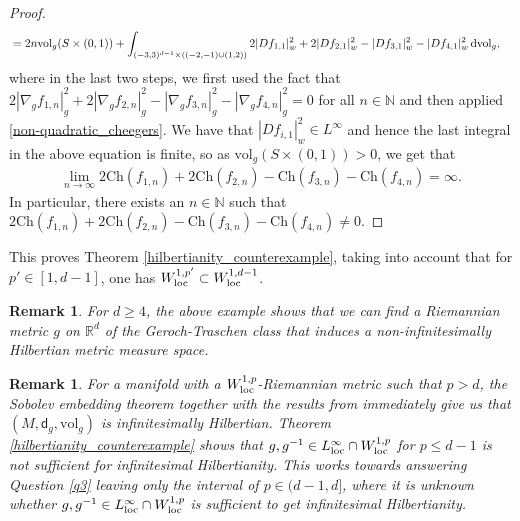 \documentclass[a4paper,10pt]{article}
\newtheorem{remark}[theorem]{Remark}
\numberwithin{equation}{section}
\newcommand{\R}{\mathbb{R}}
\newcommand{\N}{\mathbb{N}}
\newcommand{\vol}{\mathrm{vol}}
\newcommand{\Ch}{\mathrm{Ch}}
\newcommand{\sfd}{\mathsf d}
\newcommand{\di}{{\rm d}}
\begin{document}
\begin{proof}
\begin{align*}
    &= 2n \vol_g(S \times (0,1)) + \int_{(-3, 3)^{d-1}\times((-2, -1)\cup (1, 2))} 2|Df_{1,1}|^2_w +2|Df_{2,1}|^2_w-|Df_{3,1}|^2_w-|Df_{4,1}|^2_w\, \di \vol_g, 
    \end{align*}
where in the last two steps, we first used the fact that $2|\nabla_g f_{1, n}|_g^2 + 2|\nabla_g f_{2, n}|_g^2 -|\nabla_g f_{3, n}|_g^2-|\nabla_g f_{4, n}|_g^2=0$ for all $n \in \N$ and then applied \eqref{non-quadratic_cheegers}.
We have that $|Df_{i,1}|^2_w \in L^\infty$ and hence the last integral in the above equation is finite, so as $\vol_g(S \times (0,1 ))>0$, we get that 
\begin{align}
    \lim_{n \to \infty} 2\Ch(f_{1, n})+ 2\Ch(f_{2, n}) -\Ch(f_{3, n}) -\Ch(f_{4, n}) = \infty. 
\end{align}
In particular, there exists an $n \in \N$ such that $2\Ch(f_{1, n})+ 2\Ch(f_{2, n}) -\Ch(f_{3, n}) -\Ch(f_{4, n}) \neq 0$.
\end{proof}

This proves Theorem \ref{hilbertianity_counterexample}, taking into account that for $p' \in [1, d-1]$, one has $W^{1,p'}_{\rm loc} \subset W^{1,d-1}_{\rm loc}$. 

\smallskip
\begin{remark}
    For $d \geq 4$, the above example shows that we can find a Riemannian metric $g$ on $\R^d$ of the Geroch-Traschen class that induces a non-infinitesimally Hilbertian metric measure space.
\end{remark}
\smallskip

\begin{remark}
    For a manifold with a $W^{1,p}_{\rm loc}$-Riemannian metric such that $p>d$, the Sobolev embedding theorem together with the results from \cite{mondino2025equivalence} immediately give us that $(M, \sfd_g, \vol_g)$ is infinitesimally Hilbertian. Theorem \ref{hilbertianity_counterexample} shows that $g, g^{-1} \in L^\infty_{\rm loc} \cap  W^{1,p}_{\rm loc}$ for $p \leq d-1$ is not sufficient for infinitesimal Hilbertianity. This works towards answering Question \ref{q3} leaving only the interval of $p \in (d-1, d]$, where it is unknown whether $g, g^{-1} \in L^\infty_{\rm loc} \cap  W^{1,p}_{\rm loc}$ is sufficient to get infinitesimal Hilbertianity. 
\end{remark}
\smallskip
\end{document}
